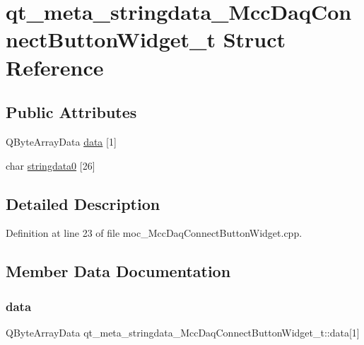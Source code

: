 \hypertarget{structqt__meta__stringdata___mcc_daq_connect_button_widget__t}{}\section{qt\+\_\+meta\+\_\+stringdata\+\_\+\+Mcc\+Daq\+Connect\+Button\+Widget\+\_\+t Struct Reference}
\label{structqt__meta__stringdata___mcc_daq_connect_button_widget__t}
\subsection*{Public Attributes}
\begin{DoxyCompactItemize}
\item 
Q\+Byte\+Array\+Data \hyperlink{structqt__meta__stringdata___mcc_daq_connect_button_widget__t_aabf571fac88ffd43ca5b9ceb2ed3bb2e}{data} \mbox{[}1\mbox{]}
\item 
char \hyperlink{structqt__meta__stringdata___mcc_daq_connect_button_widget__t_ab705b1895a10dbc66443d1e6c0c3e12b}{stringdata0} \mbox{[}26\mbox{]}
\end{DoxyCompactItemize}


\subsection{Detailed Description}


Definition at line 23 of file moc\+\_\+\+Mcc\+Daq\+Connect\+Button\+Widget.\+cpp.



\subsection{Member Data Documentation}
\mbox{\label{structqt__meta__stringdata___mcc_daq_connect_button_widget__t_aabf571fac88ffd43ca5b9ceb2ed3bb2e}} 
\subsubsection{\texorpdfstring{data}{data}}
{\footnotesize\ttfamily Q\+Byte\+Array\+Data qt\+\_\+meta\+\_\+stringdata\+\_\+\+Mcc\+Daq\+Connect\+Button\+Widget\+\_\+t\+::data\mbox{[}1\mbox{]}}




